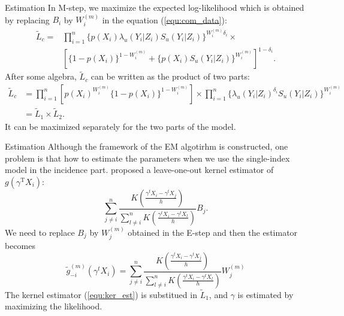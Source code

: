 \documentclass[10 pt]{beamer}
\newcommand{\Trans}  {\mathrm{T}}
\begin{document}
\begin{frame}{Estimation}
	In M-step, we maximize the expected log-likelihood which is obtained by replacing $B_i$ by $W_i^{(m)}$ in the equation (\ref{equ:com_data}):
	\begin{equation}
	\begin{aligned}
	\tilde{L}_c=& \prod_{i=1}^{n}\{p(X_i)\lambda_u(Y_i|Z_i)S_u(Y_i|Z_i)\}^{W_i^{(m)} \delta_i}\times \\ 
		&\left[\{1-p(X_i)\}^{1-W_i^{(m)}}+\{p(X_i)S_u(Y_i|Z_i)\}^{W_i^{(m)}} \right]^{1-\delta_i}.
	\end{aligned}
	\end{equation}
	After some algebra, $\tilde{L}_c$ can be written as the product of two parts:
	\begin{equation}
	\begin{aligned}
	\tilde{L}_c &= \prod_{i=1}^n \left[p(X_i)^{W_i^{(m)}}\{1-p(X_i)\}^{1-W_i^{(m)}}\right]\times 
	\prod_{i=1}^n \{\lambda_u(Y_i|Z_i)^{\delta_i}S_u(Y_i|Z_i)\}^{W_i^{(m)}} \\
	&= \tilde{L}_1 \times \tilde{L}_2.
	\end{aligned}
	\end{equation}
	It can be maximized separately for the two parts of the model.
\end{frame}

\begin{frame}{Estimation}
	Although the framework of the EM algotirhm is constructed, one problem is that how to estimate the parameters when we use the single-index model in the incidence part. \cite{Ich1993} proposed a leave-one-out kernel estimator of $g(\gamma^\Trans X_i)$:
	$$\sum_{j \neq i}^{n} \frac{K\left(\frac{\gamma^{t} X_{i}-\gamma^{t} X_{j}}{h}\right)}{\sum_{l \neq i}^{n} K\left(\frac{\gamma^{t} X_{i}-\gamma^{t} X_{l}}{h}\right)} B_{j}.$$
	We need to replace $B_j$ by $W_j^{(m)}$ obtained in the E-step and then the estimator becomes
	\begin{equation}\label{equ:ker_est}
		\tilde{g}_{-i}^{(m)}\left(\gamma^{t} {X}_{i}\right)=\sum_{j \neq i}^{n} \frac{K\left(\frac{\gamma^{t} X_{i}-\gamma^{t} X_{j}}{h}\right)}{\sum_{l \neq i}^{n} K\left(\frac{\gamma^{t} X_{i}-\gamma^{t} X_{l}}{h}\right)} W_{j}^{(m)}
	\end{equation}
	The kernel estimator (\ref{equ:ker_est}) is substitued in $\tilde{L}_1$, and $\gamma$ is estimated by maximizing the likelihood.
\end{frame}
\end{document}
